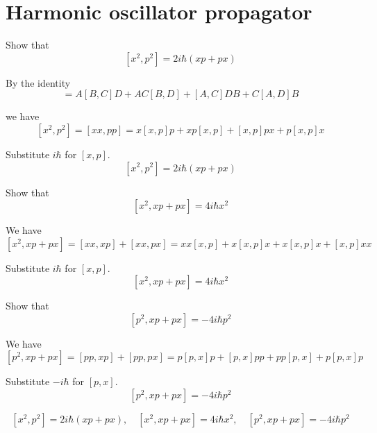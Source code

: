 

\section*{Harmonic oscillator propagator}

Show that
\begin{equation*}
\left[x^2,p^2\right]=2i\hbar(xp+px)
\tag{1}
\end{equation*}

By the identity
\begin{equation*}
[AB,CD]=A[B,C]D+AC[B,D]+[A,C]DB+C[A,D]B
\end{equation*}

we have
\begin{equation*}
\left[x^2,p^2\right]=[xx,pp]=x[x,p]p+xp[x,p]+[x,p]px+p[x,p]x
\end{equation*}

Substitute $i\hbar$ for $[x,p]$.
\begin{equation*}
\left[x^2,p^2\right]=2i\hbar(xp+px)
\end{equation*}

Show that
\begin{equation*}
\left[x^2,xp+px\right]=4i\hbar x^2
\tag{2}
\end{equation*}

We have
\begin{equation*}
\left[x^2,xp+px\right]=[xx,xp]+[xx,px]
=xx[x,p]+x[x,p]x+x[x,p]x+[x,p]xx
\end{equation*}

Substitute $i\hbar$ for $[x,p]$.
\begin{equation*}
\left[x^2,xp+px\right]=4i\hbar x^2
\end{equation*}

Show that
\begin{equation*}
\left[p^2,xp+px\right]=-4i\hbar p^2
\tag{3}
\end{equation*}

We have
\begin{equation*}
\left[p^2,xp+px\right]=[pp,xp]+[pp,px]
=p[p,x]p+[p,x]pp+pp[p,x]+p[p,x]p
\end{equation*}

Substitute $-i\hbar$ for $[p,x]$.
\begin{equation*}
\left[p^2,xp+px\right]=-4i\hbar p^2
\end{equation*}




\begin{equation*}
\left[x^2,p^2\right]=2i\hbar(xp+px),\quad
\left[x^2,xp+px\right]=4i\hbar x^2,\quad
\left[p^2,xp+px\right]=-4i\hbar p^2
\end{equation*}


